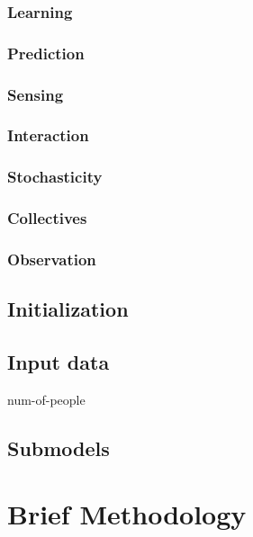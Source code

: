 \documentclass[10pt]{report}
\numberwithin{figure}{section}
\numberwithin{table}{section}
\begin{document}
\subsubsection{Learning}

\subsubsection{Prediction}

\subsubsection{Sensing}

\subsubsection{Interaction}

\subsubsection{Stochasticity}

\subsubsection{Collectives}

\subsubsection{Observation}

\subsection{Initialization}

\subsection{Input data}


num-of-people



\subsection{Submodels}





\section{Brief Methodology }
\end{document}
